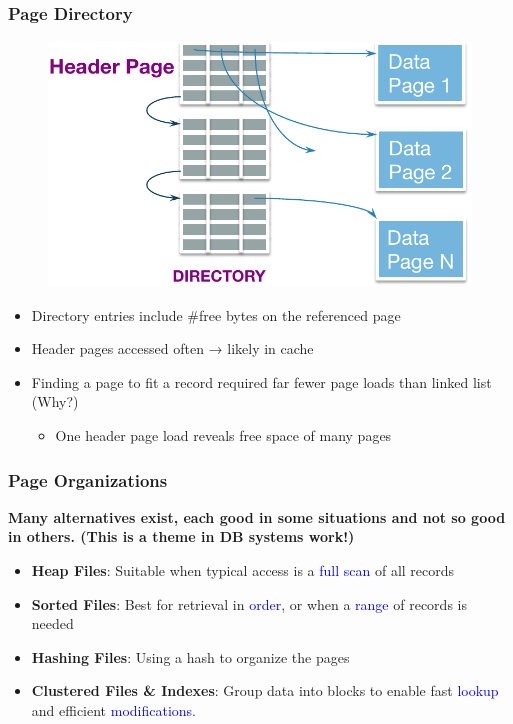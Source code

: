 \begin{frame}[fragile]
	\frametitle{Page Directory}
	\begin{figure}
		\includegraphics[width=.45\linewidth]{figs/dbfile-page-directory.pdf}
	\end{figure}
	\begin{itemize}
		\item Directory entries include \#free bytes on the referenced page
		\item Header pages accessed often → likely in cache
		\item Finding a page to fit a record required far fewer page loads than linked list (Why?)
		\begin{itemize}
			\item One header page load reveals free space of many pages
		\end{itemize}
	\end{itemize}
\end{frame}

\begin{frame}[fragile]
	\frametitle{Page Organizations}
	
	\textbf{Many alternatives exist, each good in some situations and not so good in others. 
		(This is a theme in DB systems work!)}
	
	\begin{itemize}
		\item \textbf{Heap Files}: Suitable when typical access is a \textcolor{blue}{full scan} of all records
		\item \textbf{Sorted Files}: Best for retrieval in \textcolor{blue}{order}, 
		or when a \textcolor{blue}{range} of records is needed
		\item \textbf{Hashing Files}: Using a hash to organize the pages
		\item \textbf{Clustered Files \& Indexes}: 
			Group data into blocks to enable fast \textcolor{blue}{lookup} and efficient 
			\textcolor{blue}{modifications}.
	\end{itemize}
\end{frame}

